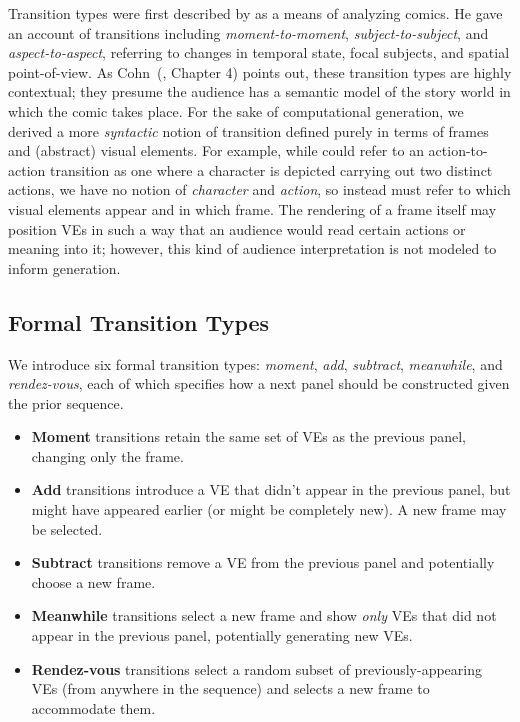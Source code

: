 Transition types were first described by  
as a means of analyzing
comics. He gave an account of transitions including {\em moment-to-moment},
{\em subject-to-subject}, and {\em aspect-to-aspect}, referring to changes
in temporal state, focal subjects, and spatial point-of-view. As 
Cohn~(\citeyear{cohn2013visual}, Chapter 4) points out, these transition types are
highly contextual; they presume the audience has a semantic model of the
story world in which the comic takes place. For the sake of
computational generation, we derived a more {\em syntactic} notion of
transition defined purely in terms of frames and (abstract) visual
elements. For example, while \citeauthor{mcCloud1993understanding} could 
refer to an action-to-action
transition as one where a character is depicted carrying out two distinct
actions, we have no notion of {\em character} and {\em action}, so instead
must refer to which visual elements appear and in which frame. The
rendering of a frame itself may position VEs in such a way that an audience
would read certain actions or meaning into it; however, this kind of
audience interpretation is not modeled to inform generation.

\subsection{Formal Transition Types}

We introduce six formal transition types: {\em moment}, {\em add}, {\em
subtract}, {\em meanwhile}, and {\em rendez-vous}, each of which specifies
how a next panel should be constructed given the prior sequence.

\begin{itemize}
\item {\bf Moment} transitions retain the same set of VEs as the previous panel, 
changing only the frame.

\item {\bf Add} transitions introduce a VE that didn't appear in the
previous panel, but might have appeared earlier (or might be completely
new). A new frame may be selected.

\item {\bf Subtract} transitions remove a VE from the previous panel and
potentially choose a new frame.

\item {\bf Meanwhile} transitions select a new frame and show {\em only}
VEs that did not appear in the previous panel, potentially generating new
VEs.

\item {\bf Rendez-vous} transitions select a random subset of
previously-appearing VEs (from anywhere in the sequence) and selects a new
frame to accommodate them.
\end{itemize}

